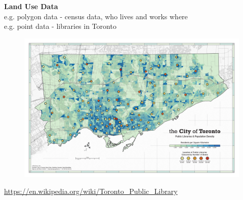 \documentclass[aspectratio=169]{beamer}
\begin{document}
\begin{frame}
	
	\textbf{Land Use Data} \\
	
	e.g. polygon data - census data, who lives and works where \\
	
	e.g. point data - libraries in Toronto
	
	\begin{figure}
		\centering
		\includegraphics[width=0.8\linewidth]{images/tor_libraries.png}
	\end{figure}
	
	\tiny\url{https://en.wikipedia.org/wiki/Toronto_Public_Library}
	
\end{frame}



	
	
\end{document}
